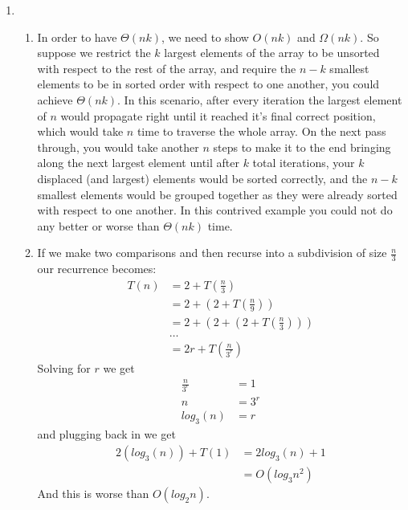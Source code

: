 \documentclass[11pt,a4paper]{article}
\begin{document}
\begin{enumerate}
		\item
		\begin{enumerate}
			\item In order to have $\Theta(nk)$, we need to show $O(nk)$ and $\Omega(nk)$. So suppose we restrict the $k$ largest elements of the array to be unsorted with respect to the rest of the array, and require the $n-k$ smallest elements to be in sorted order with respect to one another, you could achieve $\Theta(nk)$. In this scenario, after every iteration the largest element of $n$ would propagate right until it reached it's final correct position, which would take $n$ time to traverse the whole array. On the next pass through, you would take another $n$ steps to make it to the end bringing along the next largest element until after $k$ total iterations, your $k$ displaced (and largest) elements would be sorted correctly, and the $n-k$ smallest elements would be grouped together as they were already sorted with respect to one another. In this contrived example you could not do any better or worse than $\Theta(nk)$ time.
			\item If we make two comparisons and then recurse into a subdivision of size $\frac{n}{3}$ our recurrence becomes:
			\begin{align*}
				T(n) &= 2 + T(\frac{n}{3}) \\
					 &= 2 + ( 2 + T(\frac{n}{9})) \\
					 &= 2 + (2 + ( 2 + T(\frac{n}{3}))) \\
					 &\dots \\
					 &= 2r + T(\frac{n}{3^r})
			\end{align*}
			Solving for $r$ we get
			\begin{align*}
				\frac{n}{3^r} &= 1 \\
				n &= 3^r \\
				log_3 (n) &= r
			\end{align*}
			and plugging back in we get
			\begin{align*}
				2(log_3 (n)) + T(1) &= 2log_3(n) + 1\\
				&= O(log_3 n^2)
			\end{align*}
			And this is worse than $O(log_2 n)$.
		\end{enumerate}
		

\end{enumerate}
\end{document}
